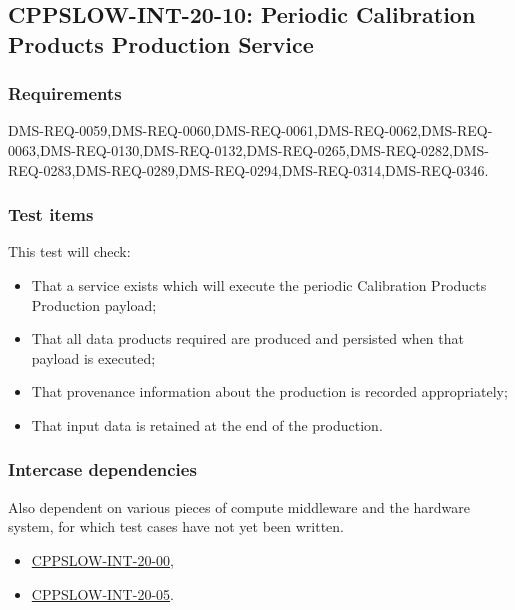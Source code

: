 \subsection{CPPSLOW-INT-20-10: Periodic Calibration Products Production Service}
\label{cppslow-int-20-10}

\subsubsection{Requirements}

DMS-REQ-0059,DMS-REQ-0060,DMS-REQ-0061,DMS-REQ-0062,DMS-REQ-0063,DMS-REQ-0130,DMS-REQ-0132,DMS-REQ-0265,DMS-REQ-0282,DMS-REQ-0283,DMS-REQ-0289,DMS-REQ-0294,DMS-REQ-0314,DMS-REQ-0346.

\subsubsection{Test items}

This test will check:

\begin{itemize}

  \item{That a service exists which will execute the periodic Calibration Products Production payload;}

  \item{That all data products required are produced and persisted when that payload is executed;}

  \item{That provenance information about the production is recorded appropriately;}

  \item{That input data is retained at the end of the production.}

\end{itemize}

\subsubsection{Intercase dependencies}

\begin{note}
  Also dependent on various pieces of compute middleware and the hardware
  system, for which test cases have not yet been written.
\end{note}

\begin{itemize}
  \item{\hyperref[cppslow-int-20-00]{CPPSLOW-INT-20-00},}
  \item{\hyperref[cppslow-int-20-05]{CPPSLOW-INT-20-05}.}
\end{itemize}

